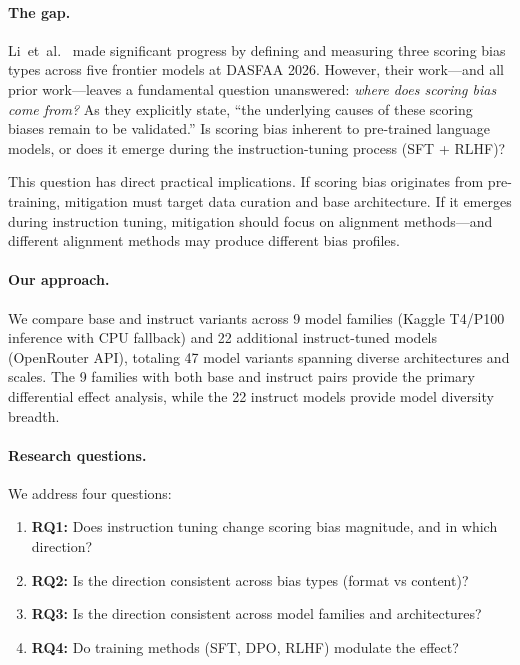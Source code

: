 \documentclass[11pt,twocolumn]{article}
\begin{document}
\paragraph{The gap.}
Li~et~al.~\cite{li2025scoring} made significant progress by defining and measuring three scoring bias types across five frontier models at DASFAA 2026. However, their work---and all prior work---leaves a fundamental question unanswered: \emph{where does scoring bias come from?} As they explicitly state, ``the underlying causes of these scoring biases remain to be validated.'' Is scoring bias inherent to pre-trained language models, or does it emerge during the instruction-tuning process (SFT + RLHF)?

This question has direct practical implications. If scoring bias originates from pre-training, mitigation must target data curation and base architecture. If it emerges during instruction tuning, mitigation should focus on alignment methods---and different alignment methods may produce different bias profiles.

\paragraph{Our approach.}
We compare base and instruct variants across 9 model families (Kaggle T4/P100 inference with CPU fallback) and 22 additional instruct-tuned models (OpenRouter API), totaling 47 model variants spanning diverse architectures and scales. The 9 families with both base and instruct pairs provide the primary differential effect analysis, while the 22 instruct models provide model diversity breadth.

\paragraph{Research questions.} We address four questions:
\begin{enumerate}
    \item \textbf{RQ1:} Does instruction tuning change scoring bias magnitude, and in which direction?
    \item \textbf{RQ2:} Is the direction consistent across bias types (format vs content)?
    \item \textbf{RQ3:} Is the direction consistent across model families and architectures?
    \item \textbf{RQ4:} Do training methods (SFT, DPO, RLHF) modulate the effect?
\end{enumerate}
\end{document}

